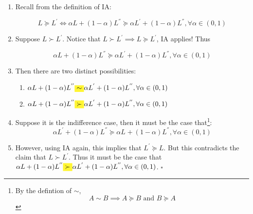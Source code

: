 \documentclass{tufte-handout}
\newcommand{\highlight}[1]{%
  \colorbox{yellow!80}{$\displaystyle#1$}}
\begin{document}
\begin{enumerate}

    \item Recall from the definition of IA:

    $$L \succcurlyeq L^{'} \iff \alpha L + (1 - \alpha) L^{''} \succcurlyeq \alpha L^{'} + (1 - \alpha) L^{''}, \forall \alpha \in (0,1)$$

    \item Suppose $L \succ L^{'}$. Notice that $L \succ L^{'} \implies L \succcurlyeq L^{'}$, IA applies! Thus

    $$\alpha L + (1 - \alpha) L^{''} \succcurlyeq \alpha L^{'} + (1 - \alpha) L^{''}, \forall \alpha \in (0,1)$$

    \item Then there are two distinct possibilities:
    \begin{enumerate}
      \item $\alpha L + (1 - \alpha) L^{''} \highlight{\sim} \alpha L^{'} + (1 - \alpha) L^{''}, \forall \alpha \in (0,1)$
      \item $\alpha L + (1 - \alpha) L^{''} \highlight{\succ} \alpha L^{'} + (1 - \alpha) L^{''}, \forall \alpha \in (0,1)$
    \end{enumerate}

    \item Suppose it is the indifference case, then it must be the case that\footnote{By the defintion of $\sim$, $$A \sim B \implies A \succcurlyeq B \text{ and } B \succcurlyeq A$$}:
    $$\alpha L^{'} + (1 - \alpha) L^{''} \succcurlyeq \alpha L^{} + (1 - \alpha) L^{''}, \forall \alpha \in (0,1)$$

    \item However, using IA again, this implies that $L^{'} \succcurlyeq L$. But this contradicts the claim that $L \succ L^{'}$. Thus it must be the case that $\alpha L + (1 - \alpha) L^{''} \highlight{\succ} \alpha L^{'} + (1 - \alpha) L^{''}, \forall \alpha \in (0,1)$. $\square$

\end{enumerate}

%
%
\end{document}
